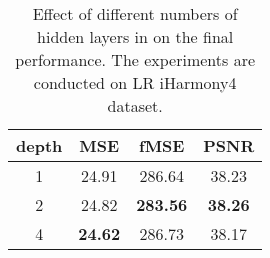 \documentclass[10pt,journal,twocolumn,twoside]{IEEEtran}
\begin{document}
\begin{table}[t]
\caption{Effect of different numbers of hidden layers in  on the final performance. The experiments are conducted on LR iHarmony4 dataset.}
    \label{tab:Cont MLP depth}
    \renewcommand{\arraystretch}{1.3} 
    \centering
    
\end{table}

\begin{table}[!ht]
\caption{Effect of different numbers of hidden layers in  on the final performance. The experiments are conducted on LR iHarmony4 dataset.}
    \label{tab:App MLP depth}
\centering
\begin{tabular}{c|ccc}
\hline
 depth & \multicolumn{1}{c}{MSE} & \multicolumn{1}{c}{fMSE} & \multicolumn{1}{c}{PSNR} \\ \hline
1     & 24.91                   & 286.64                   & 38.23                    \\
2     & 24.82                   & \textbf{283.56}          & \textbf{38.26}           \\
4     & \textbf{24.62}          & 286.73                   & 38.17                    \\ \hline
\end{tabular}
    
\end{table}
\end{document}
